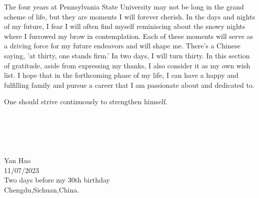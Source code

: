 The four years at Pennsylvania State University may not be long in the grand scheme of life, but they are moments I will forever cherish. In the days and nights of my future, I fear I will often find myself reminiscing about the snowy nights where I furrowed my brow in contemplation. Each of these moments will serve as a driving force for my future endeavors and will shape me. There's a Chinese saying, 'at thirty, one stands firm.' In two days, I will turn thirty. In this section of gratitude, aside from expressing my thanks, I also consider it as my own wish list. I hope that in the forthcoming phase of my life, I can have a happy and fulfilling family and pursue a career that I am passionate about and dedicated to.

One should strive continuously to strengthen himself.
\\
\\
\\
\\
\\
\\
Yan Hao
\\
11/07/2023
\\
Two days before my 30th birthday
\\
Chengdu,Sichuan,China.